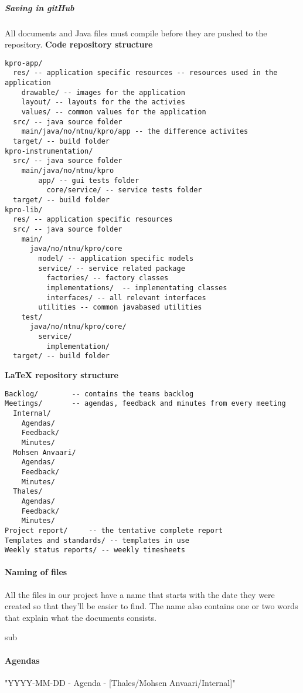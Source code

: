 \subparagraph{Saving in gitHub}\hfill
All documents and Java files must compile before they are pushed to the repository.\newline
\textbf{Code repository structure}
\begin{verbatim}
kpro-app/
  res/ -- application specific resources -- resources used in the application
    drawable/ -- images for the application
    layout/ -- layouts for the the activies
    values/ -- common values for the application
  src/ -- java source folder
    main/java/no/ntnu/kpro/app -- the difference activites
  target/ -- build folder
kpro-instrumentation/
  src/ -- java source folder
    main/java/no/ntnu/kpro
	    app/ -- gui tests folder
		  core/service/ -- service tests folder
  target/ -- build folder
kpro-lib/
  res/ -- application specific resources
  src/ -- java source folder
    main/
      java/no/ntnu/kpro/core
        model/ -- application specific models
        service/ -- service related package
          factories/ -- factory classes
          implementations/  -- implementating classes
          interfaces/ -- all relevant interfaces
        utilities -- common javabased utilities
    test/
      java/no/ntnu/kpro/core/
        service/
          implementation/
  target/ -- build folder

\end{verbatim}
\textbf{LaTeX repository structure}
\begin{verbatim}
Backlog/		-- contains the teams backlog
Meetings/		-- agendas, feedback and minutes from every meeting
  Internal/
    Agendas/
    Feedback/
    Minutes/
  Mohsen Anvaari/
    Agendas/
    Feedback/
    Minutes/
  Thales/
    Agendas/
    Feedback/
    Minutes/
Project report/		-- the tentative complete report
Templates and standards/ -- templates in use
Weekly status reports/ -- weekly timesheets

\end{verbatim}


\paragraph{Naming of files}
All the files in our project have a name that starts with the date they were created so that they’ll be easier to find. The name also contains one or two words that explain what the documents consists.

sub\paragraph{Agendas}\hfill
\newline
"YYYY-MM-DD - Agenda - [Thales/Mohsen Anvaari/Internal]"


